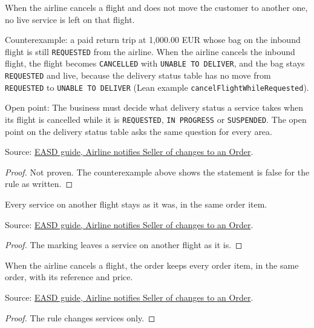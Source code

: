 \begin{theorem}
  \label{thm:airline-change-no-live-on-cancelled}
  When the airline cancels a flight and does not move the customer to
  another one, no live service is left on that flight.

  Counterexample: a paid return trip at 1,000.00 EUR whose bag on the inbound
  flight is still \texttt{REQUESTED} from the airline.  When the airline
  cancels the inbound flight, the flight becomes \texttt{CANCELLED} with
  \texttt{UNABLE TO DELIVER}, and the bag stays \texttt{REQUESTED} and live,
  because the delivery status table has no move from \texttt{REQUESTED} to
  \texttt{UNABLE TO DELIVER} (Lean example
  \texttt{cancelFlightWhileRequested}).

  Open point: The business must decide what delivery status a service takes
  when its flight is cancelled while it is \texttt{REQUESTED},
  \texttt{IN PROGRESS} or \texttt{SUSPENDED}.  The open point on the delivery
  status table asks the same question for every area.

  Source: \href{https://standards.atlassian.net/wiki/spaces/EASD/pages/815202352}{EASD guide, Airline notifies Seller of changes to an Order}.
\end{theorem}
\begin{proof}
  Not proven.  The counterexample above shows the statement is false for the
  rule as written.
\end{proof}

\begin{theorem}
  \label{thm:airline-change-other-flights-kept}
  Every service on another flight stays as it was, in the same order item.

  Source: \href{https://standards.atlassian.net/wiki/spaces/EASD/pages/815202352}{EASD guide, Airline notifies Seller of changes to an Order}.
\end{theorem}
\begin{proof}
  The marking leaves a service on another flight as it is.
\end{proof}

\begin{theorem}
  \label{thm:airline-change-items-kept}
  When the airline cancels a flight, the order keeps every order item, in the
  same order, with its reference and price.

  Source: \href{https://standards.atlassian.net/wiki/spaces/EASD/pages/815202352}{EASD guide, Airline notifies Seller of changes to an Order}.
\end{theorem}
\begin{proof}
  The rule changes services only.
\end{proof}

